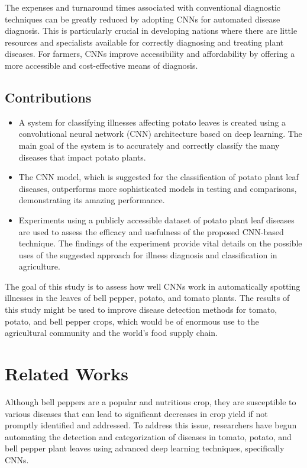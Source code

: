 \documentclass[conference]{IEEEtran}
\begin{document}
The expenses and turnaround times associated with conventional diagnostic techniques can be greatly reduced by adopting CNNs for automated disease diagnosis. This is particularly crucial in developing nations where there are little resources and specialists available for correctly diagnosing and treating plant diseases. For farmers, CNNs improve accessibility and affordability by offering a more accessible and cost-effective means of diagnosis.


\subsection{Contributions}
\begin{itemize}
    \item A system for classifying illnesses affecting potato leaves is created using a convolutional neural network (CNN) architecture based on deep learning. The main goal of the system is to accurately and correctly classify the many diseases that impact potato plants.
    \item The CNN model, which is suggested for the classification of potato plant leaf diseases, outperforms more sophisticated models in testing and comparisons, demonstrating its amazing performance.
    \item Experiments using a publicly accessible dataset of potato plant leaf diseases are used to assess the efficacy and usefulness of the proposed CNN-based technique. The findings of the experiment provide vital details on the possible uses of the suggested approach for illness diagnosis and classification in agriculture.\\
\end{itemize}
 
The goal of this study is to assess how well CNNs work in automatically spotting illnesses in the leaves of bell pepper, potato, and tomato plants. The results of this study might be used to improve disease detection methods for tomato, potato, and bell pepper crops, which would be of enormous use to the agricultural community and the world's food supply chain.

\section{Related Works}
Although bell peppers are a popular and nutritious crop, they are susceptible to various diseases that can lead to significant decreases in crop yield if not promptly identified and addressed. To address this issue, researchers have begun automating the detection and categorization of diseases in tomato, potato, and bell pepper plant leaves using advanced deep learning techniques, specifically CNNs.\\
\end{document}
